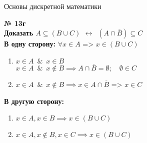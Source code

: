 \documentclass[12pt]{article}
\begin{document}
	{\centering \LARGE{Основы дискретной математики}\\\vspace{.5cm}}
\vspace{.5cm}
{
	{\textbf{№ 13г} \vspace{.5cm}\\}
	\textbf{\large{Доказать $A \subseteq (B \cup C)$ \enspace $\leftrightarrow \enspace (A \cap \overline{B}) \subseteq C$}}\vspace{.1cm} \\
	\textbf{В одну сторону:}
	$\forall x \in A$ => $x \in (B \cup C)$
	\begin{enumerate}
		\item {$x \in A \enspace \& \enspace x \in B$\\
		$x \in A \enspace \& \enspace x \notin B \implies A \cap \overline{B} = \emptyset; \quad \emptyset \in C$
	}
	\item{$x \in A \enspace \& \enspace x \notin B \implies x \in A\cap \overline{B}$ 
		=> $x \in C$\\
	
	}
	\end{enumerate}
	\textbf{В другую сторону:}
	\begin{enumerate}
		\item { $x \in A, x \in B \implies x \in (B \cup C)$
		}
		\item{$x \in A, x \notin B, x\in C \implies x \in (B \cup C)$
	
		}
	\end{enumerate}

}
\end{document}
